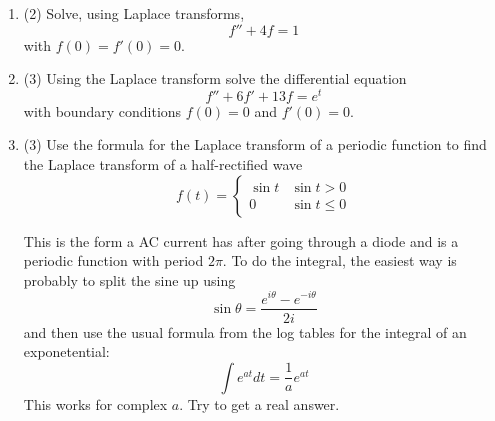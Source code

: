 \documentclass[12pt]{article}
\begin{document}
\begin{enumerate}

\item (2) Solve, using Laplace transforms, 
\begin{equation}
f''+4f=1
\end{equation}
with $f(0)=f'(0)=0$.

\item (3)
Using the Laplace transform solve the differential equation
\begin{equation}
f''+6f'+13f=e^t
\end{equation}
with boundary conditions $f(0)=0$ and $f'(0)=0$.

\item (3) Use the formula for the Laplace transform of a periodic function
to find the Laplace transform of  a half-rectified wave
\begin{equation}
f(t)=\left\{\begin{array}{ll}\sin{t}&\sin{t}>0\\0&\sin{t}\le 0\end{array}\right.\end{equation}
\begin{center}
\end{center}
This is the form a AC current has after going through a diode and is a periodic function with period $2\pi$. To do the integral, the easiest way is probably to split the sine up using
\begin{equation}
\sin{\theta}=\frac{e^{i\theta}-e^{-i\theta}}{2i}
\end{equation}
and then use the usual formula from the log tables for the integral of an exponetential:
\begin{equation}
\int e^{at}dt=\frac{1}{a}e^{at}
\end{equation}
This works for complex $a$. Try to get a real answer.
\end{enumerate}


\vfill
\end{document}
